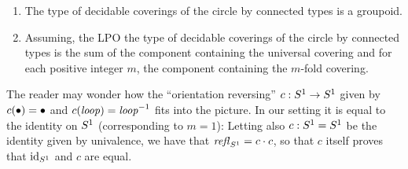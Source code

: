\begin{lemma}
  \label{lem:componentsofcoversofS1}
  \begin{enumerate}
  \item The type of decidable coverings of the circle by connected types is a groupoid.
  \item Assuming, the LPO the type of decidable coverings of the circle by connected types is the sum of the component containing the universal covering and for each positive integer $m$, the component containing the $m$-fold covering.
  \end{enumerate}

\end{lemma}





\begin{remark}
  \label{rem:flipthecircle}
  The reader may wonder how the ``orientation reversing'' $c:S^1\to S^1$ given by $c(\bullet)=\bullet$ and $c(\mathit{loop})=\mathit{loop}^{-1}$ fits into the picture.  In our setting it is equal to the identity on $S^1$ (corresponding to $m=1$): Letting also $c:S^1=S^1$ be the identity given by univalence, we have that $\mathop{{\it refl}_{S^1}}=c\cdot c$, so that $c$ itself proves that $\mathord{\mathrm{id}}_{S^1}$ and $c$ are equal.
\end{remark}



